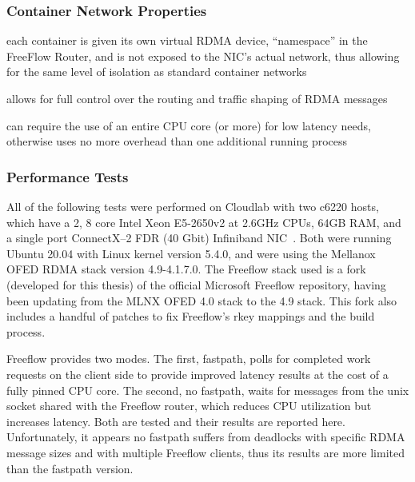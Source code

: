 \documentclass[12pt,titlepage]{article}
\begin{document}
\subsubsection*{Container Network Properties}
\begin{description}[nolistsep,font={{\scshape\bfseries}}]
	\item[Network Isolation] each container is given its own virtual RDMA device, ``namespace'' in the FreeFlow Router, and is not exposed to the NIC's actual network, thus allowing for the same level of isolation as standard container networks
	\item[Controllability] allows for full control over the routing and traffic shaping of RDMA messages
	\item[Resource Utilization] can require the use of an entire CPU core (or more) for low latency needs, otherwise uses no more overhead than one additional running process
\end{description}

\subsubsection*{Performance Tests}
All of the following tests were performed on Cloudlab with two c6220 hosts, which have a 2, 8 core Intel Xeon E5-2650v2 at 2.6GHz CPUs, 64GB RAM, and a single port ConnectX--2 FDR (40 Gbit) Infiniband NIC~\cite{cloudlab}. 
Both were running Ubuntu 20.04 with Linux kernel version 5.4.0, and were using the Mellanox OFED RDMA stack version 4.9-4.1.7.0.
The Freeflow stack used is a fork (developed for this thesis) of the official Microsoft Freeflow repository, having been updating from the MLNX OFED 4.0 stack to the 4.9 stack.
This fork also includes a handful of patches to fix Freeflow's rkey mappings and the build process.

Freeflow provides two modes.
The first, fastpath, polls for completed work requests on the client side to provide improved latency results at the cost of a fully pinned CPU core.
The second, no fastpath, waits for messages from the unix socket shared with the Freeflow router, which reduces CPU utilization but increases latency.
Both are tested and their results are reported here. 
Unfortunately, it appears no fastpath suffers from deadlocks with specific RDMA message sizes and with multiple Freeflow clients, thus its results are more limited than the fastpath version.
\end{document}
